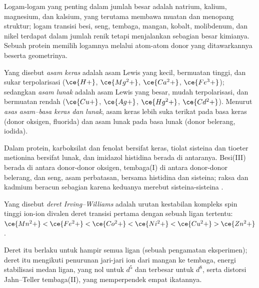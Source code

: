 Logam-logam yang penting dalam jumlah besar adalah natrium, kalium, magnesium, dan
kalsium, yang terutama membawa muatan dan menopang struktur; logam transisi
besi, seng, tembaga, mangan, kobalt, molibdenum, dan nikel terdapat dalam jumlah renik
tetapi menjalankan sebagian besar kimianya. Sebuah protein memilih logamnya melalui atom-atom donor
yang ditawarkannya beserta geometrinya.

\begin{definition}\label{def:b3:bioinorganic:hsab}
Yang disebut \emph{asam keras} adalah asam Lewis yang kecil, bermuatan tinggi, dan sukar
terpolarisasi ($\ce{H+}$, $\ce{Mg^2+}$, $\ce{Ca^2+}$, $\ce{Fe^3+}$); sedangkan \emph{asam
lunak} adalah asam Lewis yang besar, mudah terpolarisasi, dan bermuatan rendah ($\ce{Cu+}$, $\ce{Ag+}$,
$\ce{Hg^2+}$, $\ce{Cd^2+}$). Menurut \emph{asas asam--basa keras dan lunak},
asam keras lebih suka terikat pada basa keras
(donor oksigen, fluorida) dan asam lunak pada basa lunak (donor belerang, iodida).
\end{definition}

Dalam protein, karboksilat dan fenolat bersifat keras, tiolat sisteina dan
tioeter metionina bersifat lunak, dan imidazol histidina berada di antaranya. Besi(III)
berada di antara donor-donor oksigen, tembaga(I) di antara donor-donor belerang, dan seng, asam
perbatasan, bersama histidina dan sisteina; raksa dan kadmium beracun sebagian
karena keduanya merebut sisteina-sisteina .

\begin{definition}\label{def:b3:bioinorganic:irving-williams}
Yang disebut \emph{deret Irving--Williams} adalah urutan
kestabilan kompleks spin tinggi ion-ion divalen deret transisi
pertama dengan sebuah ligan tertentu:
$\ce{Mn^2+} < \ce{Fe^2+} < \ce{Co^2+} < \ce{Ni^2+} < \ce{Cu^2+} > \ce{Zn^2+}$.
\end{definition}

\begin{proposition}\label{prop:b3:bioinorganic:irving-williams}
Deret itu berlaku untuk hampir semua ligan (sebuah pengamatan eksperimen); deret itu
mengikuti penurunan jari-jari ion dari mangan ke tembaga, energi stabilisasi medan
ligan, yang nol untuk $d^5$ dan terbesar untuk $d^8$, serta distorsi Jahn--Teller
tembaga(II), yang memperpendek empat ikatannya.
\end{proposition}

